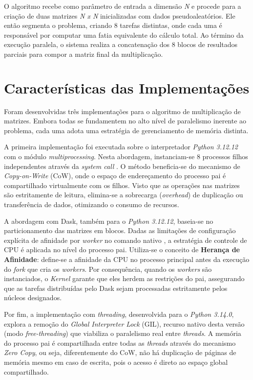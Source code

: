 \documentclass[acmsmall]{acmart}
\begin{document}
O algoritmo recebe como parâmetro de entrada a dimensão \textit{N} e procede para a criação de duas matrizes \textit{N x N} inicializadas com dados pseudoaleatórios. Ele então segmenta o problema, criando 8 tarefas distintas, onde cada uma é responsável por computar uma fatia equivalente do cálculo total. Ao término da execução paralela, o sistema realiza a concatenação dos 8 blocos de resultados parciais para compor a matriz final da multiplicação.

\section{Características das Implementações}
Foram desenvolvidas três implementações para o algoritmo de multiplicação de matrizes. Embora todas se fundamentem no alto nível de paralelismo inerente ao problema, cada uma adota uma estratégia de gerenciamento de memória distinta.

A primeira implementação foi executada sobre o interpretador \textit{Python 3.12.12} com o módulo \textit{multiprocessing}. Nesta abordagem, instanciam-se 8 processos filhos independentes através da \textit{system call} . O método beneficia-se do mecanismo de \textit{Copy-on-Write} (CoW), onde o espaço de endereçamento do processo pai é compartilhado virtualmente com os filhos. Visto que as operações nas matrizes são estritamente de leitura, elimina-se a sobrecarga (\textit{overhead}) de duplicação ou transferência de dados, otimizando o consumo de recursos.

A abordagem com Dask, também para o \textit{Python 3.12.12}, baseia-se no particionamento das matrizes em blocos. Dadas as limitações de configuração explícita de afinidade por \textit{worker} no comando nativo , a estratégia de controle de CPU é aplicada no nível do processo pai. Utiliza-se o conceito de \textbf{Herança de Afinidade}: define-se a afinidade da CPU no processo principal antes da execução do \textit{fork} que cria os \textit{workers}. Por consequência, quando os \textit{workers} são instanciados, o \textit{Kernel} garante que eles herdem as restrições do pai, assegurando que as tarefas distribuídas pelo Dask sejam processadas estritamente pelos núcleos designados.

Por fim, a implementação com \textit{threading}, desenvolvida para o \textit{Python 3.14.0}, explora a remoção do \textit{Global Interpreter Lock} (GIL), recurso nativo desta versão (modo \textit{free-threading}) que viabiliza o paralelismo real entre \textit{threads}. A memória do processo pai é compartilhada entre todas as \textit{threads} através do mecanismo \textit{Zero Copy}, ou seja, diferentemente do CoW, não há duplicação de páginas de memória mesmo em caso de escrita, pois o acesso é direto ao espaço global compartilhado.
\end{document}
